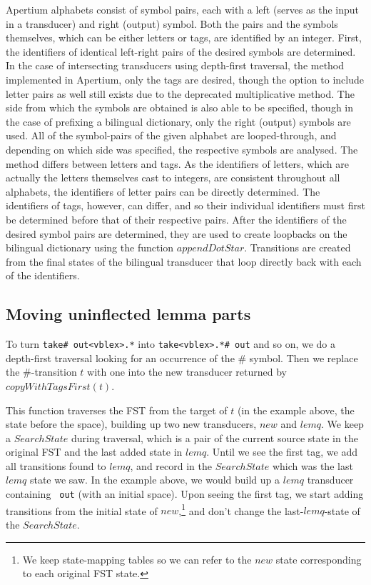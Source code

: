 \documentclass[10pt, a4paper]{article}
\newcommand{\ana}[1]{\texttt{#1}}
\begin{document}
Apertium alphabets consist of symbol pairs, each with a left (serves
as the input in a transducer) and right (output) symbol. Both the
pairs and the symbols themselves, which can be either letters or tags,
are identified by an integer. First, the identifiers of identical
left-right pairs of the desired symbols are determined. In the case of
intersecting transducers using depth-first traversal, the method
implemented in Apertium, only the tags are desired, though the option
to include letter pairs as well still exists due to the deprecated
multiplicative method. The side from which the symbols are obtained is
also able to be specified, though in the case of prefixing a bilingual
dictionary, only the right (output) symbols are used. All of the
symbol-pairs of the given alphabet are looped-through, and depending
on which side was specified, the respective symbols are analysed. The
method differs between letters and tags. As the identifiers of
letters, which are actually the letters themselves cast to integers,
are consistent throughout all alphabets, the identifiers of letter
pairs can be directly determined. The identifiers of tags, however,
can differ, and so their individual identifiers must first be
determined before that of their respective pairs. After the
identifiers of the desired symbol pairs are determined, they are used
to create loopbacks on the bilingual dictionary using the function
$appendDotStar$. Transitions are created from the final states
of the bilingual transducer that loop directly back with each of the
identifiers.

\subsection{Moving uninflected lemma parts}
\label{sec:lemqmove}

To turn \ana{take\# out<vblex>.*} into \ana{take<vblex>.*\# out} and
so on, we do a depth-first traversal looking for an occurrence of the
\# symbol. Then we replace the \#-transition $t$ with one into the new
transducer returned by $copyWithTagsFirst(t)$. 

This function traverses the FST from the target of $t$ (in the example
above, the state before the space), building up two new transducers,
$new$ and $lemq$. We keep a $SearchState$ during traversal, which is a
pair of the current source state in the original FST and the last
added state in $lemq$. Until we see the first tag, we add all
transitions found to $lemq$, and record in the $SearchState$ which was
the last $lemq$ state we saw. In the example above, we would build up
a $lemq$ transducer containing \ana{ out} (with an initial space).
Upon seeing the first tag, we start adding transitions from the
initial state of $new$,\footnote{We keep state-mapping tables so we
can refer to the $new$ state corresponding to each original FST
state.} and don't change the last-$lemq$-state of the $SearchState$.
\end{document}
